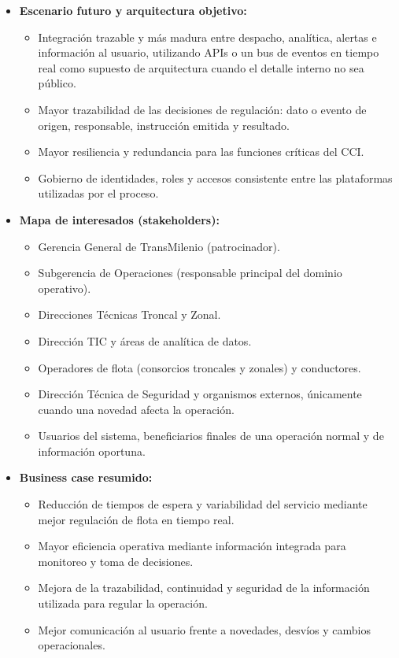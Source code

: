 \begin{singlespace}
\begin{itemize}
	\item \textbf{Escenario futuro y arquitectura objetivo:}
	\begin{itemize}
		\item[$\Rightarrow$] Integración trazable y más madura entre despacho, analítica, alertas e información al usuario, utilizando APIs o un bus de eventos en tiempo real como supuesto de arquitectura cuando el detalle interno no sea público.
		\item[$\Rightarrow$] Mayor trazabilidad de las decisiones de regulación: dato o evento de origen, responsable, instrucción emitida y resultado.
		\item[$\Rightarrow$] Mayor resiliencia y redundancia para las funciones críticas del CCI.
		\item[$\Rightarrow$] Gobierno de identidades, roles y accesos consistente entre las plataformas utilizadas por el proceso.
	\end{itemize}
	\item \textbf{Mapa de interesados (stakeholders):}
	\begin{itemize}
		\item[$\Rightarrow$] Gerencia General de TransMilenio (patrocinador).
		\item[$\Rightarrow$] Subgerencia de Operaciones (responsable principal del dominio operativo).
		\item[$\Rightarrow$] Direcciones Técnicas Troncal y Zonal.
		\item[$\Rightarrow$] Dirección TIC y áreas de analítica de datos.
		\item[$\Rightarrow$] Operadores de flota (consorcios troncales y zonales) y conductores.
		\item[$\Rightarrow$] Dirección Técnica de Seguridad y organismos externos, únicamente cuando una novedad afecta la operación.
		\item[$\Rightarrow$] Usuarios del sistema, beneficiarios finales de una operación normal y de información oportuna.
	\end{itemize}
	\item \textbf{Business case resumido:}
	\begin{itemize}
		\item[$\Rightarrow$] Reducción de tiempos de espera y variabilidad del servicio mediante mejor regulación de flota en tiempo real.
		\item[$\Rightarrow$] Mayor eficiencia operativa mediante información integrada para monitoreo y toma de decisiones.
		\item[$\Rightarrow$] Mejora de la trazabilidad, continuidad y seguridad de la información utilizada para regular la operación.
		\item[$\Rightarrow$] Mejor comunicación al usuario frente a novedades, desvíos y cambios operacionales.
	\end{itemize}
\end{itemize}


\end{singlespace}
